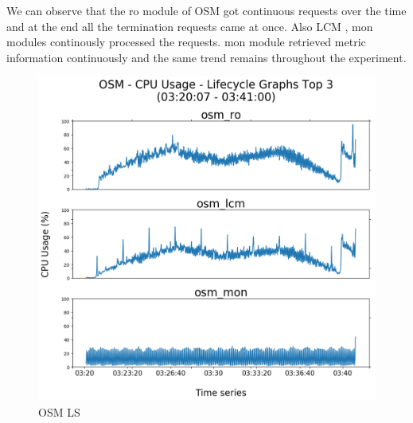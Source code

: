 We can observe that the ro module of OSM got continuous requests over the time and at the end all the termination requests came at once. Also LCM , mon modules continously processed the requests. mon module retrieved metric information continuously and the same trend
remains throughout the experiment.

\begin{figure}[h]
	\centering
	\includegraphics[width=1\linewidth]{figures/scalability_graphs/Lifecycle-Graphs-Top-3/OSM-TOP-3-Lifecycle}
	\caption{OSM LS}
	\label{fig:osm-top-3-lifecycle}
\end{figure}
